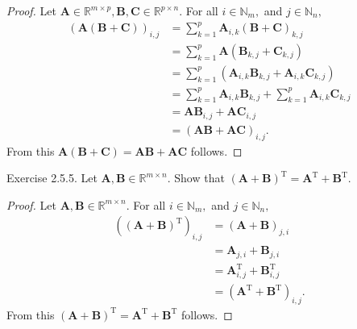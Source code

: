 \documentclass{article}
\theoremstyle{plain}
\begin{document}
\begin{proof}
	Let
	\begin{math}
		\bm{A} \in \mathbb{R}^{m \times p} , \bm{B} , \bm{C} \in \mathbb{R}^{p \times n} .
	\end{math}
	For all
	\begin{math}
		i \in \mathbb{N}_m ,
	\end{math}
	and
	\begin{math}
		j \in \mathbb{N}_n ,
	\end{math}
	\begin{equation*}
		\begin{split}
			\left( \bm{A} (\bm{B} + \bm{C}) \right)_{i,j} &= \sum_{k=1}^p \bm{A}_{i,k} (\bm{B} + \bm{C})_{k,j} \\
			&= \sum_{k=1}^p \bm{A} (\bm{B}_{k,j} + \bm{C}_{k,j}) \\
			&= \sum_{k=1}^p (\bm{A}_{i,k} \bm{B}_{k,j} + \bm{A}_{i,k} \bm{C}_{k,j}) \\
			&= \sum_{k=1}^p \bm{A}_{i,k} \bm{B}_{k,j} + \sum_{k=1}^p \bm{A}_{i,k} \bm{C}_{k,j} \\
			&= \bm{AB}_{i,j} + \bm{AC}_{i,j} \\
			&= (\bm{AB} + \bm{AC})_{i,j} .
		\end{split}
	\end{equation*}
	From this $\bm{A} (\bm{B} + \bm{C}) = \bm{AB} + \bm{AC}$ follows.
\end{proof}

\begin{itembox}[l]{Exercise 2.5.5.}
	Let
	\begin{math}
		\bm{A} , \bm{B} \in \mathbb{R}^{m \times n} .
	\end{math}
	Show that
	\begin{math}
		(\bm{A} + \bm{B})^\mathrm{T} = \bm{A}^\mathrm{T} + \bm{B}^\mathrm{T} .
	\end{math}
\end{itembox}

\begin{proof}
	Let
	\begin{math}
		\bm{A} , \bm{B} \in \mathbb{R}^{m \times n}.
	\end{math}
	For all
	\begin{math}
		i \in \mathbb{N}_m ,
	\end{math}
	and
	\begin{math}
		j \in \mathbb{N}_n ,
	\end{math}
	\begin{equation*}
		\begin{split}
			\left((\bm{A} + \bm{B})^\mathrm{T} \right)_{i,j} &= (\bm{A} + \bm{B})_{j,i} \\
			&= \bm{A}_{j,i} + \bm{B}_{j,i} \\
			&= \bm{A}_{i,j}^ \mathrm{T} + \bm{B}_{i,j}^\mathrm{T} \\
			&= (\bm{A}^ \mathrm{T} + \bm{B}^ \mathrm{T})_{i,j} .
		\end{split}
	\end{equation*}
	From this $(\bm{A} + \bm{B})^\mathrm{T} = \bm{A}^\mathrm{T} + \bm{B}^\mathrm{T}$ follows.
\end{proof}
\end{document}
